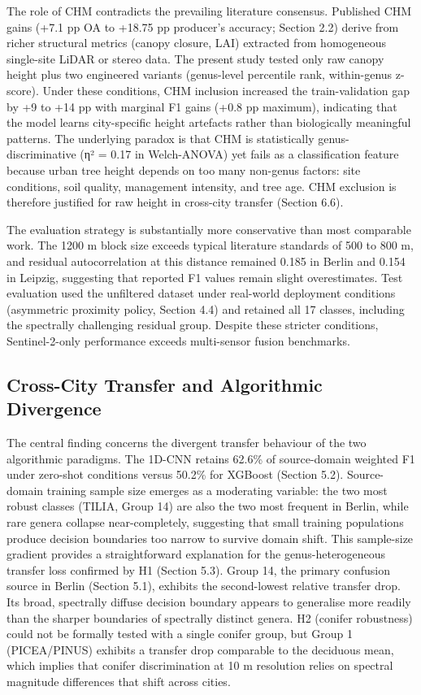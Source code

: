 \documentclass[11pt,a4paper]{scrartcl}
\begin{document}
The role of CHM contradicts the prevailing literature consensus.
Published CHM gains (+7.1 pp OA to +18.75 pp producer's accuracy;
Section 2.2) derive from richer structural metrics (canopy closure, LAI)
extracted from homogeneous single-site LiDAR or stereo data. The present
study tested only raw canopy height plus two engineered variants
(genus-level percentile rank, within-genus z-score). Under these
conditions, CHM inclusion increased the train-validation gap by +9 to
+14 pp with marginal F1 gains (+0.8 pp maximum), indicating that the
model learns city-specific height artefacts rather than biologically
meaningful patterns. The underlying paradox is that CHM is statistically
genus-discriminative (η² = 0.17 in Welch-ANOVA) yet fails as a
classification feature because urban tree height depends on too many
non-genus factors: site conditions, soil quality, management intensity,
and tree age. CHM exclusion is therefore justified for raw height in
cross-city transfer (Section 6.6).

The evaluation strategy is substantially more conservative than most
comparable work. The 1200 m block size exceeds typical literature
standards of 500 to 800 m, and residual autocorrelation at this distance
remained 0.185 in Berlin and 0.154 in Leipzig, suggesting that reported
F1 values remain slight overestimates. Test evaluation used the
unfiltered dataset under real-world deployment conditions (asymmetric
proximity policy, Section 4.4) and retained all 17 classes, including
the spectrally challenging residual group. Despite these stricter
conditions, Sentinel-2-only performance exceeds multi-sensor fusion
benchmarks.

\subsection{Cross-City Transfer and Algorithmic
Divergence}\label{cross-city-transfer-and-algorithmic-divergence}

The central finding concerns the divergent transfer behaviour of the two
algorithmic paradigms. The 1D-CNN retains 62.6\% of source-domain
weighted F1 under zero-shot conditions versus 50.2\% for XGBoost
(Section 5.2). Source-domain training sample size emerges as a
moderating variable: the two most robust classes (TILIA, Group 14) are
also the two most frequent in Berlin, while rare genera collapse
near-completely, suggesting that small training populations produce
decision boundaries too narrow to survive domain shift. This sample-size
gradient provides a straightforward explanation for the
genus-heterogeneous transfer loss confirmed by H1 (Section 5.3). Group
14, the primary confusion source in Berlin (Section 5.1), exhibits the
second-lowest relative transfer drop. Its broad, spectrally diffuse
decision boundary appears to generalise more readily than the sharper
boundaries of spectrally distinct genera. H2 (conifer robustness) could
not be formally tested with a single conifer group, but Group 1
(PICEA/PINUS) exhibits a transfer drop comparable to the deciduous mean,
which implies that conifer discrimination at 10 m resolution relies on
spectral magnitude differences that shift across cities.
\end{document}

